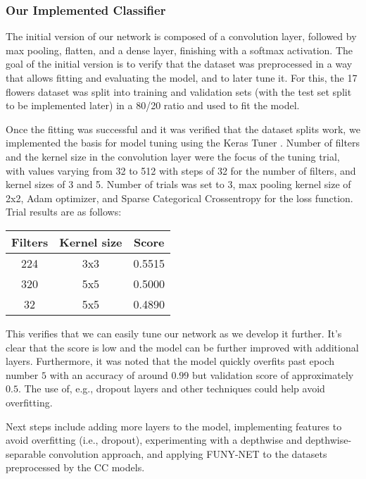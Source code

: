 \subsubsection{Our Implemented Classifier}
The initial version of our network is composed of a convolution layer, followed by max pooling, flatten, and a dense layer, finishing with a softmax activation. 
The goal of the initial version is to verify that the dataset was preprocessed in a way that allows fitting and evaluating the model, and to later tune it.
For this, the 17 flowers dataset was split into training and validation sets (with the test set split to be implemented later) in a 80/20 ratio and used to fit the model.

Once the fitting was successful and it was verified that the dataset splits work, we implemented the basis for model tuning using the Keras Tuner \cite{omalley2019kerastuner}.
Number of filters and the kernel size in the convolution layer were the focus of the tuning trial, with values varying from 32 to 512 with steps of 32 for the number of filters, and kernel sizes of 3 and 5.
Number of trials was set to 3, max pooling kernel size of 2x2, Adam optimizer, and Sparse Categorical Crossentropy for the loss function. Trial results are as follows:

\begin{tabular}{c|c|c}
    Filters&Kernel size&Score\\
    \hline
    \hline
    224&3x3&0.5515\\
    \hline
    320&5x5&0.5000\\
    \hline
    32&5x5&0.4890
\end{tabular}

This verifies that we can easily tune our network as we develop it further. It's clear that the score is low and the model can be further improved with additional layers.
Furthermore, it was noted that the model quickly overfits past epoch number $5$ with an accuracy of around $0.99$ but validation score of approximately $0.5$.
The use of, e.g., dropout layers and other techniques could help avoid overfitting.

Next steps include adding more layers to the model, implementing features to avoid overfitting (i.e., dropout), experimenting with a depthwise and depthwise-separable convolution approach, and applying FUNY-NET to the datasets preprocessed by the CC models.

